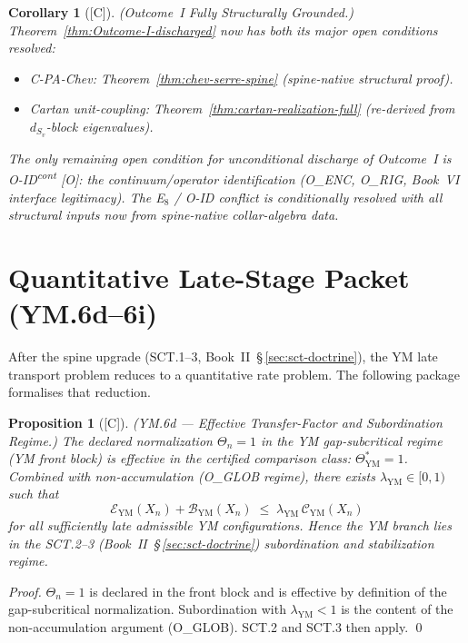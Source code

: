 \documentclass[12pt,oneside]{amsbook}
\theoremstyle{plain}
\newtheorem{proposition}[theorem]{Proposition}
\newtheorem{corollary}[theorem]{Corollary}
\theoremstyle{definition}
\theoremstyle{remark}
\newcommand{\status}[1]{\textup{[#1]}}
\begin{document}
\begin{corollary}[\status{C}]\label{cor:outcome-I-upgraded}
\textup{(Outcome~I Fully Structurally Grounded.)}
Theorem~\ref{thm:Outcome-I-discharged} now has both its major
open conditions resolved:
\begin{itemize}
 \item C-PA-Chev: Theorem~\ref{thm:chev-serre-spine}
 (spine-native structural proof).
 \item Cartan unit-coupling: Theorem~\ref{thm:cartan-realization-full}
 (re-derived from $d_{S_v}$-block eigenvalues).
\end{itemize}
The only remaining open condition for unconditional discharge of
Outcome~I is O-ID\textsuperscript{cont} [O]: the continuum/operator
identification (O\_ENC, O\_RIG, Book~VI interface legitimacy).
The E$_8$ / O-ID conflict is conditionally resolved with all
structural inputs now from spine-native collar-algebra data.
\end{corollary}

\section{Quantitative Late-Stage Packet (YM.6d--6i)}
\label{sec:YM-quantitative}

After the spine upgrade (SCT.1--3, Book~II~\S\,\ref{sec:sct-doctrine}),
the YM late transport problem reduces to a quantitative rate problem.
The following package formalises that reduction.

\begin{proposition}[\status{C}]\label{prop:YM6d}
\textup{(YM.6d --- Effective Transfer-Factor and Subordination
Regime.)}
The declared normalization $\Theta_n = 1$ in the YM gap-subcritical
regime (YM front block) is effective in the certified comparison
class: $\Theta^*_{\mathrm{YM}} = 1$. Combined with non-accumulation
(O\_GLOB regime), there exists $\lambda_{\mathrm{YM}} \in [0,1)$ such
that
\[
 \mathcal{E}_{\mathrm{YM}}(X_n) + \mathcal{B}_{\mathrm{YM}}(X_n)
 \;\leq\; \lambda_{\mathrm{YM}}\,\mathcal{C}_{\mathrm{YM}}(X_n)
\]
for all sufficiently late admissible YM configurations. Hence the
YM branch lies in the SCT.2--3 (Book~II~\S\,\ref{sec:sct-doctrine})
subordination and stabilization regime.
\end{proposition}

\begin{proof}
$\Theta_n=1$ is declared in the front block and is effective by
definition of the gap-subcritical normalization. Subordination with
$\lambda_{\mathrm{YM}}<1$ is the content of the non-accumulation
argument (O\_GLOB). SCT.2 and SCT.3 then apply. \qed
\end{proof}
\end{document}
